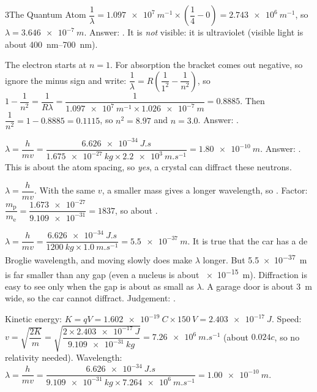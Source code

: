 \begin{chapteranswers}{3}{The Quantum Atom}
        $\dfrac{1}{\lambda} = \qty{1.097e7}{m^{-1}} \times \left(\dfrac{1}{4} - 0\right) =
        \qty{2.743e6}{m^{-1}}$, so $\lambda = \qty{3.646e-7}{m}$.
        Answer: . It is \emph{not} visible: it is ultraviolet
        (visible light is about \qtyrange{400}{700}{nm}).
  \item The electron starts at $n = 1$. For absorption the bracket comes out negative, so
        ignore the minus sign and write:
        $\dfrac{1}{\lambda} = R\left(\dfrac{1}{1^2} - \dfrac{1}{n^2}\right)$, so
        $1 - \dfrac{1}{n^2} = \dfrac{1}{R\lambda} =
        \dfrac{1}{\qty{1.097e7}{m^{-1}} \times \qty{1.026e-7}{m}} = 0.8885$.
        Then $\dfrac{1}{n^2} = 1 - 0.8885 = 0.1115$, so $n^2 = 8.97$ and $n = 3.0$.
        Answer: .
  \item $\lambda = \dfrac{h}{mv} = \dfrac{\qty{6.626e-34}{J.s}}{\qty{1.675e-27}{kg} \times
        \qty{2.2e3}{m.s^{-1}}} = \qty{1.80e-10}{m}$.
        Answer: . This is about the atom spacing, so
        \emph{yes}, a crystal can diffract these neutrons.
  \item $\lambda = \dfrac{h}{mv}$. With the same $v$, a smaller mass gives a longer
        wavelength, so .
        Factor: $\dfrac{m_\mathrm{p}}{m_\mathrm{e}} = \dfrac{\num{1.673e-27}}{\num{9.109e-31}}
        = 1837$, so about .
  \item $\lambda = \dfrac{h}{mv} = \dfrac{\qty{6.626e-34}{J.s}}{\qty{1200}{kg} \times
        \qty{1.0}{m.s^{-1}}} = \qty{5.5e-37}{m}$.
        It is true that the car has a de Broglie wavelength, and moving slowly does make
        $\lambda$ longer. But \qty{5.5e-37}{m} is far smaller than any gap (even a nucleus is
        about \qty{e-15}{m}). Diffraction is easy to see only when the gap is about as small
        as $\lambda$. A garage door is about \qty{3}{m} wide, so the car cannot diffract.
        Judgement: .
  \item Kinetic energy: $K = qV = \qty{1.602e-19}{C} \times \qty{150}{V} = \qty{2.403e-17}{J}$.
        Speed: $v = \sqrt{\dfrac{2K}{m}} = \sqrt{\dfrac{2 \times \qty{2.403e-17}{J}}
        {\qty{9.109e-31}{kg}}} = \qty{7.26e6}{m.s^{-1}}$ (about $0.024c$, so no relativity
        needed). Wavelength: $\lambda = \dfrac{h}{mv} = \dfrac{\qty{6.626e-34}{J.s}}
        {\qty{9.109e-31}{kg} \times \qty{7.264e6}{m.s^{-1}}} = \qty{1.00e-10}{m}$.

\end{chapteranswers}
